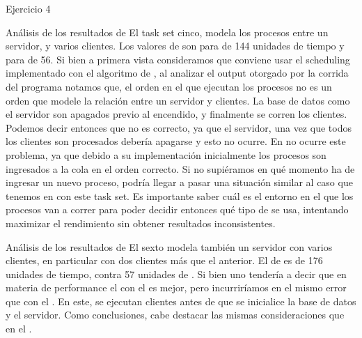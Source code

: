 \begin{section}{Ejercicio 4}
\begin{subsection}{Análisis de los resultados de }
	El task set cinco, modela los procesos entre un servidor, y varios clientes. Los valores de  son para  de 144 unidades de tiempo y para  de 56. Si bien a primera vista consideramos que conviene usar el scheduling implementado con el algoritmo de , al analizar el output otorgado por la corrida del programa notamos que, el orden en el que ejecutan los procesos no es un orden que modele la relación entre un servidor y clientes. La base de datos como el servidor son apagados previo al encendido, y finalmente se corren los clientes. Podemos decir entonces que no es correcto, ya que el servidor, una vez que todos los clientes son procesados debería apagarse y esto no ocurre. 
	En  no ocurre este problema, ya que debido a su implementación inicialmente los procesos son ingresados a la cola en el orden correcto. Si no supiéramos en qué momento ha de ingresar un nuevo proceso, podría llegar a pasar una situación similar al caso que tenemos en  con este task set.
	Es importante saber cuál es el entorno en el que los procesos van a correr para poder decidir entonces qué tipo de  se usa, intentando maximizar el rendimiento sin obtener resultados inconsistentes.
\end{subsection}

\begin{subsection}{Análisis de los resultados de }
	El sexto  modela también un servidor con varios clientes, en particular con dos clientes más que el  anterior. El  de  es de 176 unidades de tiempo, contra 57 unidades de . Si bien uno tendería a decir que en materia de performance el  con el   es mejor, pero incurriríamos en el mismo error que con el . En este, se ejecutan clientes antes de que se inicialice la base de datos y el servidor. Como conclusiones, cabe destacar las mismas consideraciones que en el .
\end{subsection}

\end{section}

